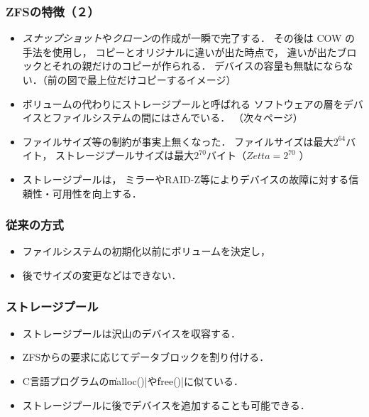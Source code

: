 \documentclass{beamer}                   %
\begin{document}
\begin{frame}
  \frametitle{ZFSの特徴（２）}
  \begin{itemize}
  \item \emph{スナップショット}や\emph{クローン}の作成が一瞬で完了する．
    その後は COW の手法を使用し，
    コピーとオリジナルに違いが出た時点で，
    違いが出たブロックとそれの親だけのコピーが作られる．
    デバイスの容量も無駄にならない．（前の図で最上位だけコピーするイメージ）
  \item ボリュームの代わりにストレージプールと呼ばれる
    ソフトウェアの層をデバイスとファイルシステムの間にはさんでいる．
    （次々ページ）
  \item ファイルサイズ等の制約が事実上無くなった．
    ファイルサイズは最大$2^{64}$バイト，
    ストレージプールサイズは最大$2^{70}$バイト（$Zetta = 2^{70}$ ）
  \item ストレージプールは，
    ミラーやRAID-Z等によりデバイスの故障に対する信頼性・可用性を向上する．
  \end{itemize}
  \vfill
\end{frame}

\begin{frame}[fragile]
  \frametitle{従来の方式}
  \begin{itemize}
  \item ファイルシステムの初期化以前にボリュームを決定し，
  \item 後でサイズの変更などはできない．
  \end{itemize}
  \vfill
\end{frame}
  
\begin{frame}[fragile]
  \frametitle{ストレージプール}
  \begin{itemize}
  \item ストレージプールは沢山のデバイスを収容する．
  \item ZFSからの要求に応じてデータブロックを割り付ける．
  \item C言語プログラムの\|malloc()|や\|free()|に似ている．
  \item ストレージプールに後でデバイスを追加することも可能できる．
  \end{itemize}
  \vfill
\end{frame}
  
\end{document}
